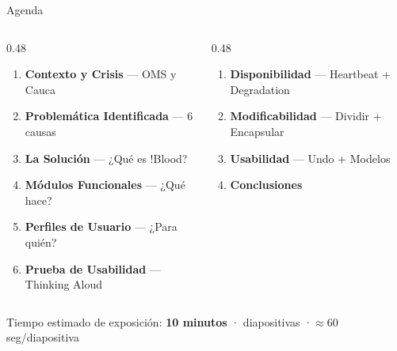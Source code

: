 \documentclass[aspectratio=169, 12pt]{beamer}
\newcommand{\redtext}[1]{{\color{bloodlt}#1}}
\begin{document}
\begin{frame}{Agenda}
  \begin{columns}[T]
    \begin{column}{0.48\textwidth}
      \begin{enumerate}\color{offwhite}
        \setlength\itemsep{7pt}
        \item \textbf{Contexto y Crisis} — OMS y Cauca
        \item \textbf{Problemática Identificada} — 6 causas
        \item \textbf{La Solución} — ¿Qué es !Blood?
        \item \textbf{Módulos Funcionales} — ¿Qué hace?
        \item \textbf{Perfiles de Usuario} — ¿Para quién?
        \item \textbf{Prueba de Usabilidad} — Thinking Aloud
      \end{enumerate}
    \end{column}
    \begin{column}{0.48\textwidth}
      \begin{enumerate}\color{offwhite}
        \setlength\itemsep{7pt}
        \setcounter{enumi}{6}
        \item \textbf{Disponibilidad} — Heartbeat + Degradation
        \item \textbf{Modificabilidad} — Dividir + Encapsular
        \item \textbf{Usabilidad} — Undo + Modelos
        \item \textbf{Conclusiones}
      \end{enumerate}
    \end{column}
  \end{columns}
  \vfill
  \begin{tcolorbox}[graybox]
    \small Tiempo estimado de exposición: \redtext{\textbf{10 minutos}} \quad· diapositivas \quad·\quad $\approx$60 seg/diapositiva
  \end{tcolorbox}
\end{frame}
\end{document}
